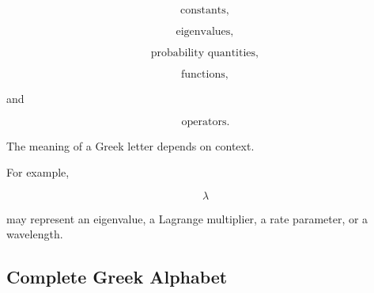 \[
\boxed{
\text{constants},
}
\]

\[
\boxed{
\text{eigenvalues},
}
\]

\[
\boxed{
\text{probability quantities},
}
\]

\[
\boxed{
\text{functions},
}
\]

and

\[
\boxed{
\text{operators}.
}
\]

The meaning of a Greek letter depends on context.

For example,

\[
\lambda
\]

may represent an eigenvalue, a Lagrange multiplier, a rate parameter, or a
wavelength.

\subsection{Complete Greek Alphabet}
\label{subsec:complete-greek-alphabet}


